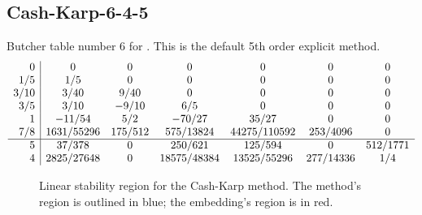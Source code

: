 \documentclass[letterpaper,10pt,english]{sphinxmanual}
\begin{document}
\subsection{Cash-Karp-6-4-5}
\label{Butcher:cash-karp-6-4-5}\label{Butcher:butcher-cash-karp}
Butcher table number 6
for {\hyperref[c_interface/User_callable:c.ARKodeSetERKTableNum]{\emph{}}}.  This is
the default 5th order explicit method.
\begin{gather}
\begin{split}\begin{array}{r|cccccc}
  0 & 0 & 0 & 0 & 0 & 0 & 0 \\
  1/5 & 1/5 & 0 & 0 & 0 & 0 & 0 \\
  3/10 & 3/40 & 9/40 & 0 & 0 & 0 & 0 \\
  3/5 & 3/10 & -9/10 & 6/5 & 0 & 0 & 0 \\
  1 & -11/54 & 5/2 & -70/27 & 35/27 & 0 & 0 \\
  7/8 & 1631/55296 & 175/512 & 575/13824 & 44275/110592 & 253/4096 & 0 \\
  \hline
  5 & 37/378 & 0 & 250/621 & 125/594 & 0 & 512/1771 \\
  4 & 2825/27648 & 0 & 18575/48384 & 13525/55296 & 277/14336 & 1/4
\end{array}\end{split}\notag
\end{gather}\begin{figure}[htbp]
\centering
\capstart

\caption{Linear stability region for the Cash-Karp method.  The method's
region is outlined in blue; the embedding's region is in red.}\end{figure}
\end{document}
